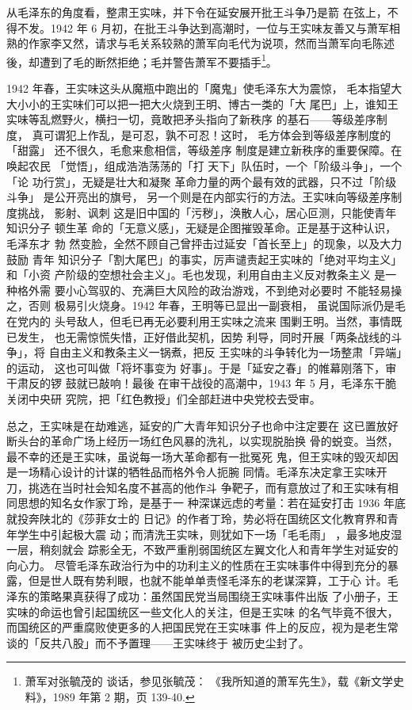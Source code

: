 从毛泽东的角度看，整肃王实味，并下令在延安展开批王斗争乃是箭 在弦上，不
得不发。1942 年 6 月初，在批王斗争达到高潮时，一位与王实味友善又与萧军相
熟的作家李又然，请求与毛关系较熟的萧军向毛代为说项，然而当萧军向毛陈述
後，却遭到了毛的断然拒绝；毛并警告萧军不要插手\footnote{萧军对张毓茂的
谈话，参见张毓茂： 《我所知道的萧军先生》，载《新文学史料》，1989 年第
2 期，页 139-40.}。

1942 年春，王实味这头从魔瓶中跑出的「魔鬼」使毛泽东大为震惊， 毛本指望大
大小小的王实味们可以把一把大火烧到王明、博古一类的「大 尾巴」上，谁知王
实味等乱燃野火，横扫一切，竟敢把矛头指向了新秩序 的基石——等级差序制度，
真可谓犯上作乱，是可忍，孰不可忍！这时， 毛方体会到等级差序制度的「甜露」
还不很久，毛愈来愈相信，等级差序 制度是建立新秩序的重要保障。在唤起农民
「觉悟」，组成浩浩荡荡的「打 天下」队伍时，一个「阶级斗争」，一个「论
功行赏」，无疑是壮大和凝聚 革命力量的两个最有效的武器，只不过「阶级斗争」
是公开亮出的旗号， 另一个则是在内部实行的方法。王实味向等级差序制度挑战，
影射、讽刺 这是旧中国的「污秽」，涣散人心，居心叵测，只能使青年知识分子
顿生革 命的「无意义感」，无疑是企图摧毁革命。正是基于这种认识，毛泽东才
勃 然变脸，全然不顾自己曾抨击过延安「首长至上」的现象，以及大力鼓励 青年
知识分子「割大尾巴」的事实，厉声谴责起王实味的「绝对平均主义」和「小资
产阶级的空想社会主义」。毛也发现，利用自由主义反对教条主义 是一种格外需
要小心驾驭的、充满巨大风险的政治游戏，不到绝对必要时 不能轻易操之，否则
极易引火烧身。1942 年春，王明等已显出一副衰相， 虽说国际派仍是毛在党内的
头号敌人，但毛已再无必要利用王实味之流来 围剿王明。当然，事情既已发生，
也无需惊慌失惜，正好借此契机，因势 利导，同时开展「两条战线的斗争」，将
自由主义和教条主义一锅煮，把反 王实味的斗争转化为一场整肃「异端」的运动，
这也可叫做「将坏事变为 好事」。于是「延安之春」的帷幕刚落下，审干肃反的锣
鼓就已敲响！最後 在审干战役的高潮中，1943 年 5 月，毛泽东干脆关闭中央研
究院，把「红色教授」们全部赶进中央党校去受审。

总之，王实味是在劫难逃，延安的广大青年知识分子也命中注定要在
这已置放好断头台的革命广场上经历一场红色风暴的洗礼，以实现脱胎换
骨的蜕变。当然，最不幸的还是王实味，虽说每一场大革命都有一批冤死
鬼，但王实味的毁灭却因是一场精心设计的计谋的牺牲品而格外令人扼腕
同情。毛泽东决定拿王实味开刀，挑选在当时社会知名度不甚高的他作斗
争靶子，而有意放过了和王实味有相同思想的知名女作家丁玲，是基于一
种深谋远虑的考量：若在延安打击 1936 年底就投奔陕北的《莎菲女士的
日记》的作者丁玲，势必将在国统区文化教育界和青年学生中引起极大震
动；而清洗王实味，则犹如下一场「毛毛雨」
，最多地皮湿一层，稍刻就会
踪影全无，不致严重削弱国统区左翼文化人和青年学生对延安的向心力。
尽管毛泽东政治行为中的功利主义的性质在王实味事件中得到充分的暴
露，但是世人既有势利眼，也就不能单单责怪毛泽东的老谋深算，工于心
计。毛泽东的策略果真获得了成功：虽然国民党当局围绕王实味事件出版
了小册子，王实味的命运也曾引起国统区一些文化人的关注，但是王实味
的名气毕竟不很大，而国统区的严重腐败使更多的人把国民党在王实味事
件上的反应，视为是老生常谈的「反共八股」而不予置理——王实味终于
被历史尘封了。

